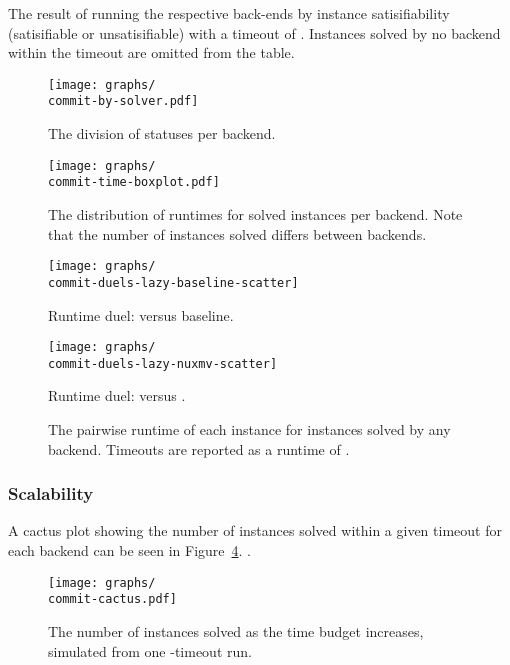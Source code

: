 \documentclass[acmsmall,review,anonymous,screen]{acmart}\settopmatter{printfolios=true,printccs=false,printacmref=true}
\theoremstyle{definition}
\begin{document}
\begin{table}[ht]
  \centering
  
  \caption{The result of running the respective back-ends by instance
  satisifiability (satisifiable or unsatisifiable) with a timeout of
  \RuntimeTimeout. Instances solved by no backend within the timeout are omitted
  from the table. }\label{tab:solve-status}
\end{table}

\begin{figure}
  \texttt{[image: graphs/\\commit-by-solver.pdf]}
  \caption{The division of statuses per backend.}
  \label{fig:solve-division}
\end{figure}


\begin{figure}
  \texttt{[image: graphs/\\commit-time-boxplot.pdf]}
  \caption{The distribution of runtimes for solved instances per backend. Note that the number of instances solved differs between backends.}
  \label{fig:runtime-boxplot}
\end{figure}


\begin{figure}
  \begin{minipage}[b]{0.75\linewidth}
    \centering 
      \texttt{[image: graphs/\\commit-duels-lazy-baseline-scatter]}
      \caption{Runtime duel: \Calculus{} versus baseline.}
      \texttt{[image: graphs/\\commit-duels-lazy-nuxmv-scatter]}
      \caption{Runtime duel: \Calculus{} versus \Nuxmv.}
    \end{minipage}  
  \caption{The pairwise runtime of each instance for instances solved by any backend. Timeouts are reported as a runtime of \RuntimeTimeout.}
  \label{fig:duels}
\end{figure}

\subsubsection{Scalability}\label{sec:scaling}

A cactus plot showing the number of instances solved within a given timeout for each backend can be seen in Figure~\ref{fig:cactus}. .

\begin{figure}
  \texttt{[image: graphs/\\commit-cactus.pdf]}
  \caption{The number of instances solved as the time budget increases, simulated from one \RuntimeTimeout-timeout run.}
  \label{fig:cactus}
\end{figure}
\end{document}
